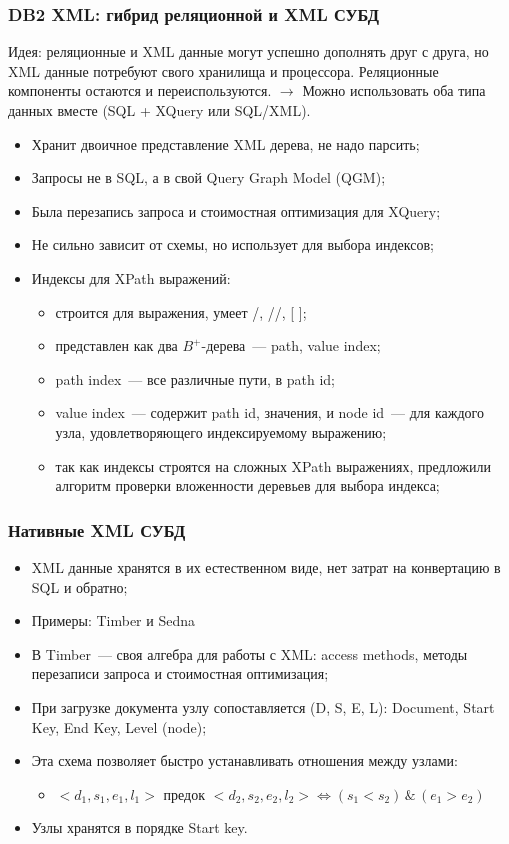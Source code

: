 \documentclass{beamer}
\begin{document}
\begin{frame}
\frametitle{DB2 XML: гибрид реляционной и XML СУБД}
Идея: реляционные и XML данные могут успешно дополнять друг с друга, но XML данные потребуют свого хранилища и процессора. Реляционные компоненты остаются и переиспользуются. $\longrightarrow$ Можно использовать оба типа данных вместе (SQL + XQuery или SQL/XML).

\begin{itemize}
  \item Хранит двоичное представление XML дерева, не надо парсить;
  \item Запросы не в SQL, а в свой Query Graph Model (QGM);
  \item Была перезапись запроса и стоимостная оптимизация для XQuery;
  \item Не сильно зависит от схемы, но использует для выбора индексов;
  \item Индексы для XPath выражений: 
  \begin{itemize}
    \item строится для выражения, умеет /, //, [ ];
    \item представлен как два $B^{+}$-дерева~--- path, value index;
    \item path index~--- все различные пути, в path id;
    \item value index~--- содержит path id, значения, и node id~--- для каждого узла, удовлетворяющего индексируемому выражению;     
    \item так как индексы строятся на сложных XPath выражениях, предложили алгоритм проверки вложенности деревьев для выбора индекса;
  \end{itemize}
\end{itemize}
\end{frame}

\begin{frame}
\frametitle{Нативные XML СУБД \cite{Grust2009}}

\begin{itemize}
  \setlength\itemsep{1em}
  \item XML данные хранятся в их естественном виде, нет затрат на конвертацию в SQL и обратно;
  \item Примеры: Timber \cite{Jagadish2002} и Sedna \cite{Taranov2010}
  \item В Timber~--- своя алгебра для работы с XML: access methods, методы перезаписи запроса и стоимостная оптимизация;
  \item При загрузке документа узлу сопоставляется (D, S, E, L): Document, Start Key, End Key, Level (node);
  \item Эта схема позволяет быстро устанавливать отношения между узлами:
  \begin{itemize}
    \item $<d_1, s_1, e_1, l_1>$ предок $<d_2, s_2, e_2, l_2> \iff (s_1 < s_2)\, \& \, (e_1 > e_2)$
  \end{itemize}
  \item Узлы хранятся в порядке Start key.
\end{itemize}
\end{frame}
\end{document}
